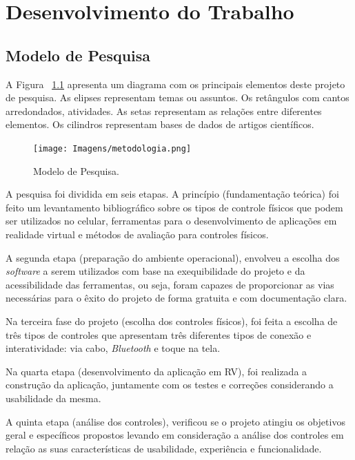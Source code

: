\chapter{Desenvolvimento do Trabalho}
\label{c.desenvolvimento}

\section{Modelo de Pesquisa}
\label{s.metodo}

A Figura ~\ref{f.metodopesquisa} apresenta um diagrama com os principais elementos deste projeto de pesquisa. As elipses representam temas ou assuntos. Os retângulos com cantos arredondados, atividades. As setas representam as relações entre diferentes elementos. Os cilindros representam bases de dados de artigos científicos.

\begin{figure}[H]
	\caption{\small Modelo de Pesquisa.}
	\centering
	\texttt{[image: Imagens/metodologia.png]}
	\label{f.metodopesquisa}
\end{figure}

A pesquisa foi dividida em seis etapas. A princípio (fundamentação teórica) foi feito um levantamento bibliográfico sobre os tipos de controle físicos que podem ser utilizados no celular, ferramentas para o desenvolvimento de aplicações em realidade virtual e métodos de avaliação para controles físicos.

A segunda etapa (preparação do ambiente operacional), envolveu a escolha dos \textit{software} a serem utilizados com base na exequibilidade do projeto e da acessibilidade das ferramentas, ou seja, foram capazes de proporcionar as vias necessárias para o êxito do projeto de forma gratuita e com documentação clara. 

Na terceira fase do projeto (escolha dos controles físicos), foi feita a escolha de três tipos de controles que apresentam três diferentes tipos de conexão e interatividade: via cabo, \textit{Bluetooth} e toque na tela. 

Na quarta etapa (desenvolvimento da aplicação em RV), foi realizada a construção da aplicação, juntamente com os testes e correções considerando a usabilidade da mesma.

A quinta etapa (análise dos controles), verificou se o projeto atingiu os objetivos geral e específicos propostos levando em consideração a análise dos controles em relação as suas características de usabilidade, experiência e funcionalidade. 

